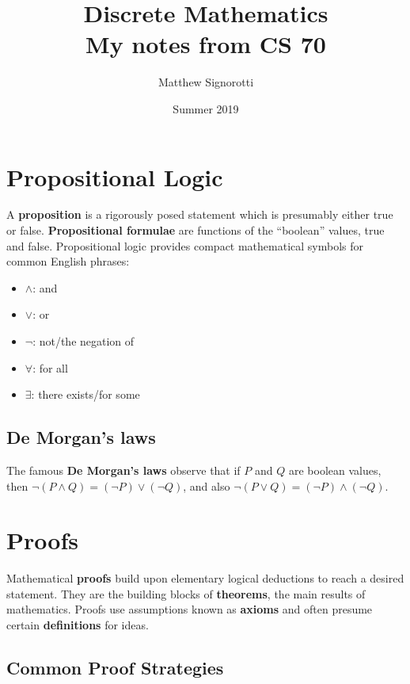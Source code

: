 \documentclass[12pt]{article}
\title{\LARGE Discrete Mathematics \\ \vspace{.5em} \large My notes from CS 70 \vspace{2em}}
\author{Matthew Signorotti}
\date{Summer 2019}
\begin{document}
\maketitle

\tableofcontents

\section{Propositional Logic}

A \textbf{proposition} is a rigorously posed statement which is presumably either true or false. \textbf{Propositional formulae} are functions of the ``boolean'' values, true and false. Propositional logic provides compact mathematical symbols for common English phrases:
\begin{itemize}
\item $\wedge$: and
\item $\vee$: or
\item $\neg$: not/the negation of
\item $\forall$: for all
\item $\exists$: there exists/for some
\end{itemize}

\subsection{De Morgan's laws}

The famous \textbf{De Morgan's laws} observe that if $P$ and $Q$ are boolean values, then $\neg (P \wedge Q) = (\neg P) \vee (\neg Q)$, and also $\neg(P \vee Q) = (\neg P) \wedge (\neg Q)$.

\section{Proofs}

Mathematical \textbf{proofs} build upon elementary logical deductions to reach a desired statement. They are the building blocks of \textbf{theorems}, the main results of mathematics. Proofs use assumptions known as \textbf{axioms} and often presume certain \textbf{definitions} for ideas.

\subsection{Common Proof Strategies}
\end{document}
